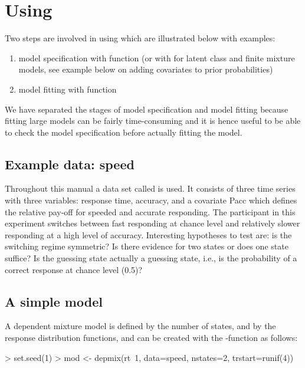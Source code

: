 \documentclass[article]{jss}
\begin{document}
\section[Using depmixS4]{Using }

Two steps are involved in using  which are illustrated
below with examples:
\begin{enumerate}
	\item model specification with function  (or with 
	for latent class and finite mixture models, see example below on adding
	covariates to prior probabilities)
	
	\item  model fitting with function 
\end{enumerate}
We have separated the stages of model specification and model fitting because
fitting large models can be fairly time-consuming and it is hence useful to be
able to check the model specification before actually fitting the model. 

\subsection{Example data: speed}

Throughout this manual a data set called  is used.  It
consists of three time series with three variables: response time,
accuracy, and a covariate Pacc which defines the relative pay-off for
speeded and accurate responding.  The participant in this experiment
switches between fast responding at chance level and relatively slower
responding at a high level of accuracy.  Interesting hypotheses to
test are: is the switching regime symmetric?  Is there evidence for
two states or does one state suffice?  Is the guessing state actually
a guessing state, i.e., is the probability of a correct response at
chance level (0.5)?

\subsection{A simple model}

A dependent mixture model is defined by the number of states, and by
the response distribution functions, and can be created with the
-function as follows:

\begin{CodeChunk}
\begin{CodeInput}
> set.seed(1)
> mod <- depmix(rt~1, data=speed, nstates=2, trstart=runif(4))
\end{CodeInput}
\end{CodeChunk}
\end{document}
